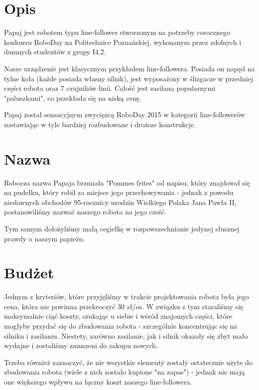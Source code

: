 \documentclass{article}
\begin{document}

\tableofcontents
\newpage

\section{Opis}

Papaj jest robotem typu line-follower stworzonym na potrzeby corocznego konkursu RoboDay na Politechnice Poznańskiej, wykonanym przez zdolnych i dumnych studentów z grupy I4.2. 

Nasze urządzenie jest klasycznym przykładem line-followera. Posiada on napęd na tylne koła (każde posiada własny silnik), jest wyposażony w ślizgacze w przedniej części robota oraz 7 czujników linii. Całość jest zasilana popularnymi "paluszkami", co przekłada się na niską cenę.

Papaj został sensacyjnym zwycięzcą RoboDay 2015 w kategorii line-followerów zostawiając w tyle bardziej rozbudowane i droższe konstrukcje.

\section{Nazwa}
				
Robocza nazwa Papaja brzmiała "Pommes frites" od napisu, który znajdował się na pudełku, który robił za miejsce jego przechowywania - jednak z powodu niedawnych obchodów 95-rocznicy urodzin Wielkiego Polaka Jana Pawła II, postanowiliśmy nazwać naszego robota na jego cześć. 

Tym samym dołożyliśmy małą cegiełkę w rozpowszechnianie jedynej słusznej prawdy o naszym papieżu. 
						
\section{Budżet}

Jednym z kryteriów, które przyjęliśmy w trakcie projektowania robota była jego cena, która nie powinna przekroczyć 30 zł/os. W związku z tym staraliśmy się maksymalnie ciąć koszty, szukając u siebie i wśród znajomych części, które mogłyby przydać się do zbudowania robota - szczególnie koncentrując się na silniku i zasilaniu. Niestety, zarówno zasilanie, jak i silnik okazały się zbyt mało wydajne i zostaliśmy zmuszeni do zakupu nowych.

Trzeba również zaznaczyć, że nie wszystkie elementy zostały ostatecznie użyte do zbudowania robota (wiele z nich zostało kupione "na zapas") - jednak nie mają one większego wpływu na łączny koszt naszego line-followera.
\end{document}
